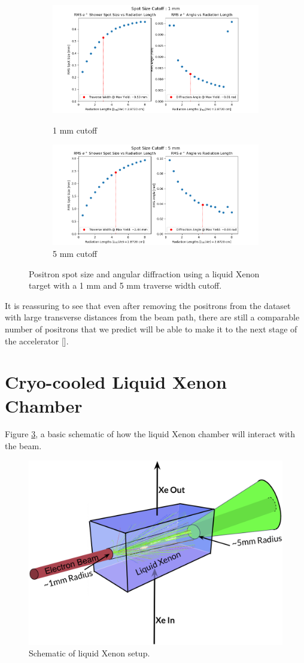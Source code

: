 \documentclass[%
reprint,
amsmath, amssymb,
aps,
floatfix,
]{revtex4-2}
\begin{document}
\begin{figure}[H]
    \begin{subfigure}{.5\textwidth}
        \includegraphics[height = .445\linewidth]{../images/XeATW1mmCutoff.png}
        \caption{\label{fig:XeATW1}1 mm cutoff}
        \includegraphics[height = .5\linewidth]{../images/XeATW5mmCutoff.png}
        \caption{\label{fig:XeATW5}5 mm cutoff}
    \end{subfigure}
    \caption{\label{fig:ATWCut}Positron spot size and angular diffraction using 
    a liquid Xenon target with a 1 mm and 5 mm traverse width cutoff.}
\end{figure}
It is reassuring to see that even after removing the positrons from the dataset 
with large transverse distances from the beam path, there are still a comparable number
of positrons that we predict will be able to make it to the next stage of the accelerator [].

\section{Cryo-cooled Liquid Xenon Chamber}
Figure \ref{fig:schem}, a basic schematic of how the liquid Xenon chamber will interact with the beam.
\begin{figure}[H]
    \includegraphics[width = .5\textwidth]{../images/Schematic3.png}
    \caption{\label{fig:schem}Schematic of liquid Xenon setup.}
\end{figure}
\end{document}
